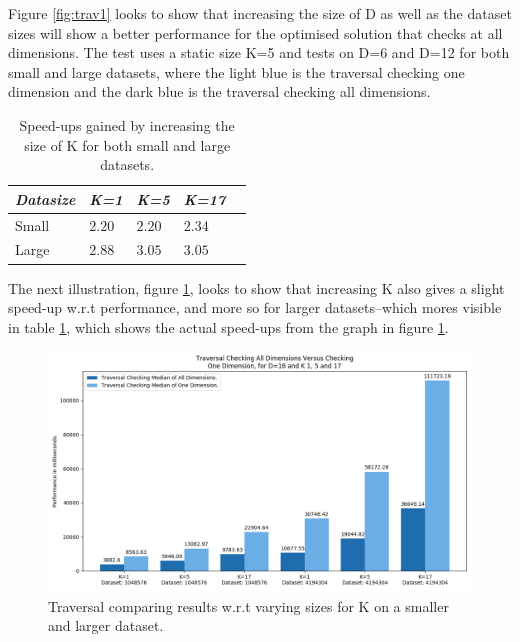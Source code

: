 Figure \ref{fig:trav1} looks to show that increasing the size of D as well as the dataset sizes will show a better performance for the optimised solution that checks at all dimensions. The test uses a static size K=5 and tests on D=6 and D=12 for both small and large datasets, where the light blue is the traversal checking one dimension and the dark blue is the traversal checking all dimensions. 



\begin{table}[H]
\centering
\begin{tabular}{@{} *5l @{}}    \toprule
\emph{Datasize} & \emph{K=1} & \emph{K=5} & \emph{K=17} &  \\\midrule
Small     & $2.20$  & $2.20$  & $2.34$  &   \\ 
Large     & $2.88$ & $3.05$ & $3.05$ & \\ \bottomrule
 \hline
\end{tabular}
\caption{Speed-ups gained by increasing the size of K for both small and large datasets.}
\label{tab:travk}
\end{table}

The next illustration, figure \ref{fig:trav2}, looks to show that increasing K also gives a slight speed-up w.r.t performance, and more so for larger datasets--which mores visible in table \ref{tab:travk}, which shows the actual speed-ups from the graph in figure \ref{fig:trav2}.




\begin{figure}[H]
\centering
\includegraphics[width=1\textwidth]{pics/plot-figs/trav-d16.png}
\caption{Traversal comparing results w.r.t varying sizes for K on a smaller and larger dataset.}
\label{fig:trav2}
\end{figure}


